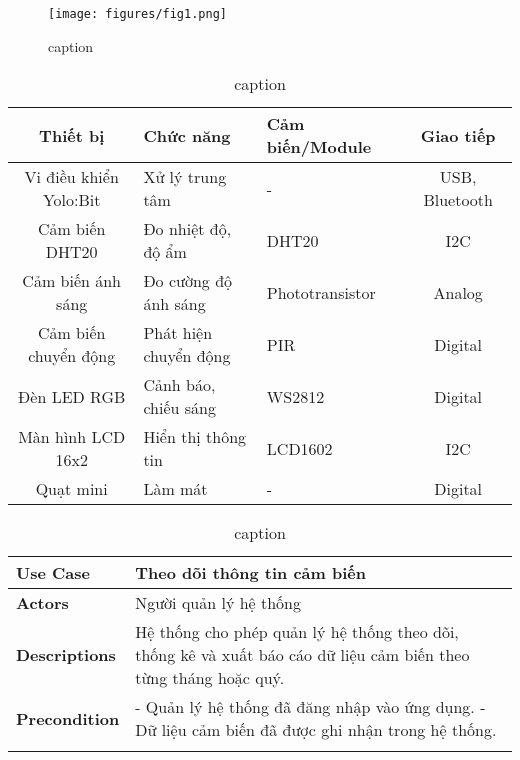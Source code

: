 \begin{figure}[H]
    \centering
    \texttt{[image: figures/fig1.png]}
    \caption{caption}
    \label{fig:fig1}
\end{figure}


\begin{table}[H]
    \centering
    \begin{tabularx}{\textwidth}{|c|>{\raggedright\arraybackslash}X|>{\raggedright\arraybackslash}X|c|}
        \hline
        \textbf{Thiết bị}      & \textbf{Chức năng}    & \textbf{Cảm biến/Module} & \textbf{Giao tiếp} \\
        \hline
        Vi điều khiển Yolo:Bit & Xử lý trung tâm       & -                        & USB, Bluetooth     \\
        \hline
        Cảm biến DHT20         & Đo nhiệt độ, độ ẩm    & DHT20                    & I2C                \\
        \hline
        Cảm biến ánh sáng      & Đo cường độ ánh sáng  & Phototransistor          & Analog             \\
        \hline
        Cảm biến chuyển động   & Phát hiện chuyển động & PIR                      & Digital            \\
        \hline
        Đèn LED RGB            & Cảnh báo, chiếu sáng  & WS2812                   & Digital            \\
        \hline
        Màn hình LCD 16x2      & Hiển thị thông tin    & LCD1602                  & I2C                \\
        \hline
        Quạt mini              & Làm mát               & -                        & Digital            \\
        \hline
    \end{tabularx}
    \caption{caption}
    \label{tab:tab1}
\end{table}

\begin{longtable}{|p{}|p{}|}
    \hline
    \textbf{Use Case}     & \textbf{Theo dõi thông tin cảm biến}                                                                             \\
    \hline
    \textbf{Actors}       & Người quản lý hệ thống                                                                                           \\
    \hline
    \textbf{Descriptions} & Hệ thống cho phép quản lý hệ thống theo dõi, thống kê và xuất báo cáo dữ liệu cảm biến theo từng tháng hoặc quý. \\
    \hline
    \textbf{Precondition} &
    - Quản lý hệ thống đã đăng nhập vào ứng dụng. \newline
    - Dữ liệu cảm biến đã được ghi nhận trong hệ thống.                                                                                      \\
    \hline
    \caption{caption}
    \label{tab:table}
\end{longtable}

